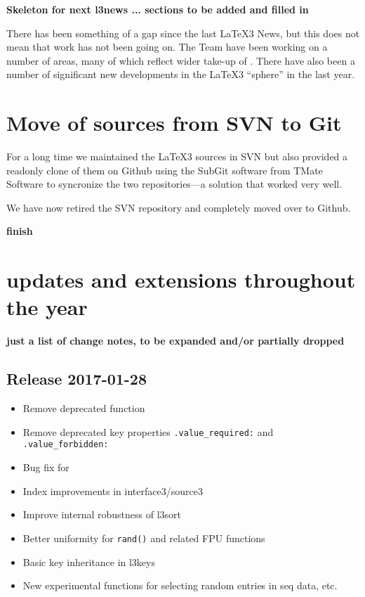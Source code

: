 \documentclass{ltnews}
\begin{document}
\maketitle

\tableofcontents  %

\textbf{Skeleton for next l3news ... sections to be added and filled in}

There has been something of a gap since the last \LaTeX3 News, but this does
not mean that work has not been going on. The Team have been working on a
number of areas, many of which reflect wider take-up of . There have
also been a number of significant new developments in the \LaTeX3
\enquote{sphere} in the last year.

\section{Move of sources from SVN to Git}

For a long time we maintained the \LaTeX3 sources in SVN but also provided a
readonly clone of them on Github using the SubGit software from TMate Software
to syncronize the two repositories---a solution that worked very well.

We have now retired the SVN repository and completely moved over to
Github.

\textbf{finish}





\section{ updates and extensions throughout the year}

\textbf{just a list of change notes, to be expanded and/or partially dropped}


\subsection{Release 2017-01-28}

\begin{itemize}
\item Remove deprecated function 
\item Remove deprecated key properties \texttt{.value_required:}
  and \texttt{.value_forbidden:}
\item Bug fix for 
\item Index improvements in interface3/source3
\item Improve internal robustness of l3sort
\item Better uniformity for \texttt{rand()} and related
  FPU functions
\item Basic key inheritance in l3keys
\item New experimental functions for selecting random
  entries in seq data, etc.
\end{itemize}  
\end{document}
